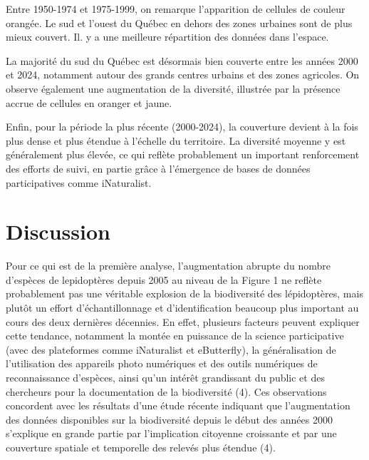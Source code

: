 \documentclass[9pt,twocolumn,twoside,]{pnas-new}
\begin{document}
Entre 1950-1974 et 1975-1999, on remarque l'apparition de cellules de
couleur orangée. Le sud et l'ouest du Québec en dehors des zones
urbaines sont de plus mieux couvert. Il. y a une meilleure répartition
des données dans l'espace.

La majorité du sud du Québec est désormais bien couverte entre les
années 2000 et 2024, notamment autour des grands centres urbains et des
zones agricoles. On observe également une augmentation de la diversité,
illustrée par la présence accrue de cellules en oranger et jaune.

Enfin, pour la période la plus récente (2000-2024), la couverture
devient à la fois plus dense et plus étendue à l'échelle du territoire.
La diversité moyenne y est généralement plus élevée, ce qui reflète
probablement un important renforcement des efforts de suivi, en partie
grâce à l'émergence de bases de données participatives comme
iNaturalist.

\section{Discussion}\label{discussion}

Pour ce qui est de la première analyse, l'augmentation abrupte du nombre
d'espèces de lepidoptères depuis 2005 au niveau de la Figure 1 ne
reflète probablement pas une véritable explosion de la biodiversité des
lépidoptères, mais plutôt un effort d'échantillonnage et
d'identification beaucoup plus important au cours des deux dernières
décennies. En effet, plusieurs facteurs peuvent expliquer cette
tendance, notamment la montée en puissance de la science participative
(avec des plateformes comme iNaturalist et eButterfly), la
généralisation de l'utilisation des appareils photo numériques et des
outils numériques de reconnaissance d'espèces, ainsi qu'un intérêt
grandissant du public et des chercheurs pour la documentation de la
biodiversité (4). Ces observations concordent avec les résultats d'une
étude récente indiquant que l'augmentation des données disponibles sur
la biodiversité depuis le début des années 2000 s'explique en grande
partie par l'implication citoyenne croissante et par une couverture
spatiale et temporelle des relevés plus étendue (4).
\end{document}
